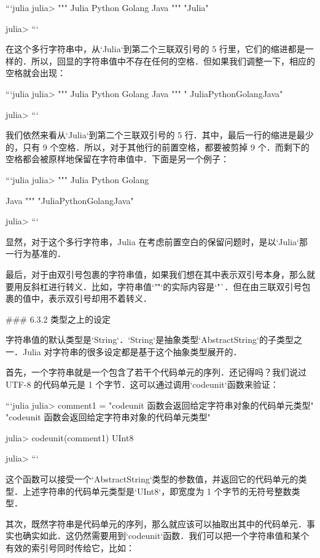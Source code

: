 ```julia
julia> """
       Julia
       Python
       Golang
       Java
       """
"Julia\nPython\nGolang\nJava\n"

julia> 
```

在这个多行字符串中，从`Julia`到第二个三联双引号的 5 行里，它们的缩进都是一样的．所以，回显的字符串值中不存在任何的空格．但如果我们调整一下，相应的空格就会出现：

```julia
julia> """
           Julia
             Python
               Golang
                 Java
         """
"  Julia\n    Python\n      Golang\n        Java\n"

julia> 
```

我们依然来看从`Julia`到第二个三联双引号的 5 行．其中，最后一行的缩进是最少的，只有 9 个空格．所以，对于其他行的前置空格，都要被剪掉 9 个．而剩下的空格都会被原样地保留在字符串值中．下面是另一个例子：

```julia
julia> """
       Julia
         Python
           Golang
             
             Java
         """
"Julia\n  Python\n    Golang\n      \n      Java\n  "

julia> 
```

显然，对于这个多行字符串，Julia 在考虑前置空白的保留问题时，是以`Julia`那一行为基准的．

最后，对于由双引号包裹的字符串值，如果我们想在其中表示双引号本身，那么就要用反斜杠进行转义．比如，字符串值`"\""`的实际内容是`"`．但在由三联双引号包裹的值中，表示双引号却用不着转义．

### 6.3.2 类型之上的设定

字符串值的默认类型是`String`．`String`是抽象类型`AbstractString`的子类型之一．Julia 对字符串的很多设定都是基于这个抽象类型展开的．

首先，一个字符串就是一个包含了若干个代码单元的序列．还记得吗？我们说过 UTF-8 的代码单元是 1 个字节．这可以通过调用`codeunit`函数来验证：

```julia
julia> comment1 = "codeunit 函数会返回给定字符串对象的代码单元类型"
"codeunit 函数会返回给定字符串对象的代码单元类型"

julia> codeunit(comment1)
UInt8

julia> 
```

这个函数可以接受一个`AbstractString`类型的参数值，并返回它的代码单元的类型．上述字符串的代码单元类型是`UInt8`，即宽度为 1 个字节的无符号整数类型．

其次，既然字符串是代码单元的序列，那么就应该可以抽取出其中的代码单元．事实也确实如此．这仍然需要用到`codeunit`函数．我们可以把一个字符串值和某个有效的索引号同时传给它，比如：

